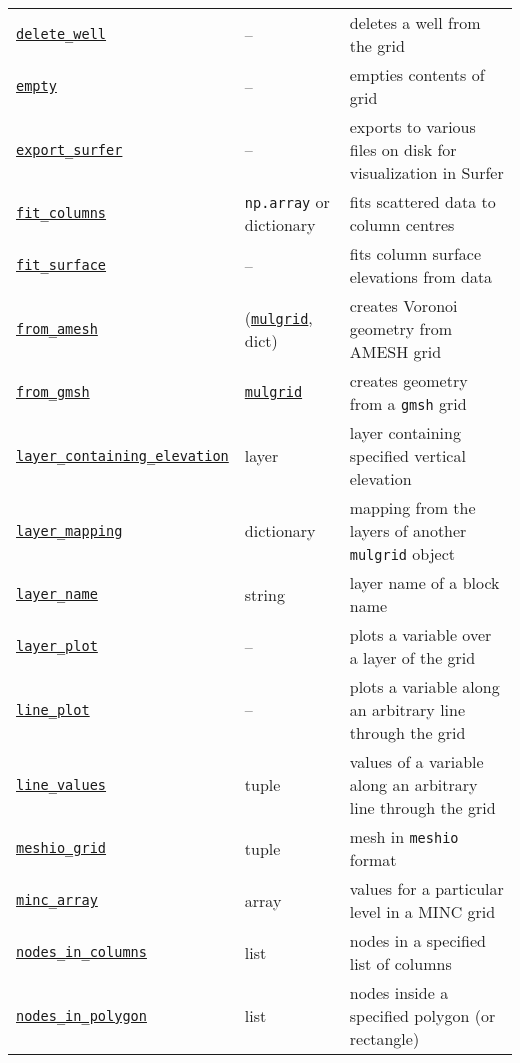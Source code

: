 \begin{center}
\begin{longtable}{|l|l|p{70mm}|}
  \hyperref[sec:mulgrid:delete_well]{\texttt{delete\_well}} & -- & deletes a well from the grid\\ 
  \hyperref[sec:mulgrid:empty]{\texttt{empty}} & --  & empties contents of grid\\
  \hyperref[sec:mulgrid:export_surfer]{\texttt{export\_surfer}} & -- & exports to various files on disk for visualization in Surfer\\ 
  \hyperref[sec:mulgrid:fit_columns]{\texttt{fit\_columns}} & \texttt{np.array} or dictionary & fits scattered data to column centres\\ 
  \hyperref[sec:mulgrid:fit_surface]{\texttt{fit\_surface}} & -- & fits column surface elevations from data\\ 
  \hyperref[sec:mulgrid:from_amesh]{\texttt{from\_amesh}} & (\hyperref[mulgrids]{\texttt{mulgrid}}, dict) & creates Voronoi geometry from AMESH grid\\ 
  \hyperref[sec:mulgrid:from_gmsh]{\texttt{from\_gmsh}} & \hyperref[mulgrids]{\texttt{mulgrid}} & creates geometry from a \texttt{gmsh} grid\\ 
  \hyperref[sec:mulgrid:layer_containing_elevation]{\texttt{layer\_containing\_elevation}} & layer & layer containing specified vertical elevation\\
  \hyperref[sec:mulgrid:layer_mapping]{\texttt{layer\_mapping}} & dictionary & mapping from the layers of another \texttt{mulgrid} object\\
  \hyperref[sec:mulgrid:layer_name]{\texttt{layer\_name}} & string & layer name of a block name\\ 
  \hyperref[sec:mulgrid:layer_plot]{\texttt{layer\_plot}} & -- & plots a variable over a layer of the grid\\
  \hyperref[sec:mulgrid:line_plot]{\texttt{line\_plot}} & -- & plots a variable along an arbitrary line through the grid\\
  \hyperref[sec:mulgrid:line_values]{\texttt{line\_values}} & tuple & values of a variable along an arbitrary line through the grid\\
  \hyperref[sec:mulgrid:meshio_grid]{\texttt{meshio\_grid}} & tuple & mesh in \texttt{meshio} format\\ 
  \hyperref[sec:mulgrid:minc_array]{\texttt{minc\_array}} & array & values for a particular level in a MINC grid\\ 
  \hyperref[sec:mulgrid:nodes_in_columns]{\texttt{nodes\_in\_columns}} & list & nodes in a specified list of columns\\ 
  \hyperref[sec:mulgrid:nodes_in_polygon]{\texttt{nodes\_in\_polygon}} & list & nodes inside a specified polygon (or rectangle)\\ 

\end{longtable}
\end{center}
